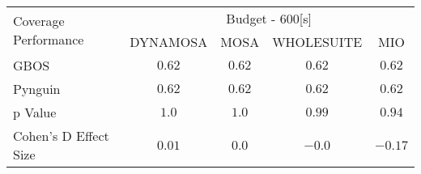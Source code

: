 \begin{tabular}{lcccc}\toprule 
\multirow{2}{*}{Coverage Performance} & \multicolumn{4}{c}{Budget - 600[s] } \\ \cmidrule(lr){2-5}  
                                      & DYNAMOSA&MOSA&WHOLESUITE&MIO                         \\ \midrule 
GBOS                                  & \(0.62\)&\(0.62\)&\(0.62\)&\(0.62\)                       \\ 
Pynguin                               & \(0.62\)&\(0.62\)&\(0.62\)&\(0.62\)                       \\ 
p Value                               & \(1.0\)&\(1.0\)&\(0.99\)&\(0.94\)                     \\ 
Cohen's D Effect Size                 & \(0.01\)&\(0.0\)&\(-0.0\)&\(-0.17\)                       \\ 
\bottomrule 
\end{tabular}